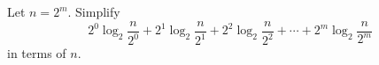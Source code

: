 Let $n=2^m$. Simplify
\[2^0\log_2\dfrac{n}{2^0}+2^1\log_2\dfrac{n}{2^1}+2^2\log_2\dfrac{n}{2^2}+\cdots+2^m\log_2\dfrac{n}{2^m}\]
in terms of $n$.
